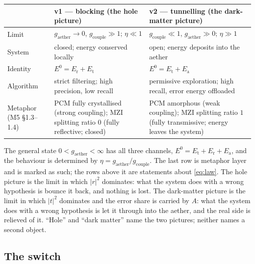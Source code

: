 \documentclass[11pt,a4paper]{article}
\newcommand{\Ezero}{E^{0}}
\newcommand{\gcouple}{g_{\mathrm{couple}}}
\newcommand{\gaether}{g_{\mathrm{aether}}}
\begin{document}
\begin{center}
\begin{tabular}{@{}p{2.6cm}p{5.2cm}p{5.4cm}@{}}
\toprule
 & \textbf{v1 --- blocking (the hole picture)} & \textbf{v2 --- tunnelling (the dark-matter picture)} \\
\midrule
Limit & $\gaether \to 0$, $\gcouple \gg 1$; $\eta \ll 1$ & $\gcouple \ll 1$, $\gaether \gg 0$; $\eta \gg 1$ \\
System & closed; energy conserved locally & open; energy deposits into the aether \\
Identity & $\Ezero = E_{\mathrm{r}} + E_{\mathrm{t}}$ & $\Ezero = E_{\mathrm{t}} + E_{\mathrm{a}}$ \\
Algorithm & strict filtering; high precision, low recall & permissive exploration; high recall, error energy offloaded \\
Metaphor (M5 §1.3--1.4) & PCM fully crystallised (strong coupling); MZI splitting ratio $0$ (fully reflective; closed) & PCM amorphous (weak coupling); MZI splitting ratio $1$ (fully transmissive; energy leaves the system) \\
\bottomrule
\end{tabular}
\end{center}

The general state $0 < \gaether < \infty$ has all three channels, $\Ezero = E_{\mathrm{t}} + E_{\mathrm{r}} + E_{\mathrm{a}}$, and the behaviour is determined by $\eta = \gaether/\gcouple$. The last row is metaphor layer and is marked as such; the rows above it are statements about \eqref{eq:law}. The hole picture is the limit in which $\lvert r\rvert^2$ dominates: what the system does with a wrong hypothesis is bounce it back, and nothing is lost. The dark-matter picture is the limit in which $\lvert t\rvert^2$ dominates and the error share is carried by $A$: what the system does with a wrong hypothesis is let it through into the aether, and the real side is relieved of it. ``Hole'' and ``dark matter'' name the two pictures; neither names a second object.

\subsection{The switch}
\label{sec:duality-switch}
\end{document}
